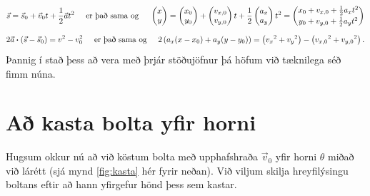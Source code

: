 \ifdefined \wholebook \else\documentclass[oneside]{book}\usepackage{EdlBook}\graphicspath{{figures/}}
\begin{document}
\begin{align*}
    \vec{s} = \vec{s}_0 + \vec{v}_0 t + \frac{1}{2}\vec{a}t^2 \hspace{0.5cm} \text{er það sama og} \hspace{0.5cm} \begin{pmatrix}
x\\
y \\
\end{pmatrix} = \begin{pmatrix}
x_0\\
y_0 \\
\end{pmatrix} + \begin{pmatrix}
v_{x,0}\\
v_{y,0} \\
\end{pmatrix} t + \frac{1}{2} \begin{pmatrix}
a_x\\
a_y \\
\end{pmatrix} t^2 = \begin{pmatrix}
x_0 + v_{x,0} + \frac{1}{2}a_x t^2\\[2pt]
y_0 + v_{y,0} + \frac{1}{2}a_y t^2
\end{pmatrix}
\end{align*}
\begin{align*}
       2\vec{a} \vdot (\vec{s} - \vec{s}_0) = v^2 - v_0^2 \hspace{0.5cm} \text{er það sama og} \hspace{0.5cm} 2\left( a_x (x-x_0) + a_y (y - y_0) \right) = \left( {v_x}^2 + {v_y}^2 \right) - \left( {v_{x,0}}^2 + {v_{y,0}}^2 \right).
\end{align*}
Þannig í stað þess að vera með þrjár stöðujöfnur þá höfum við tæknilega séð fimm núna.

\section{Að kasta bolta yfir horni}

Hugsum okkur nú að við köstum bolta með upphafshraða $\vec{v}_0$ yfir horni $\theta$ miðað við lárétt (sjá mynd \ref{fig:kasta} hér fyrir neðan). Við viljum skilja hreyfilýsingu boltans eftir að hann yfirgefur hönd þess sem kastar.
\end{document}
